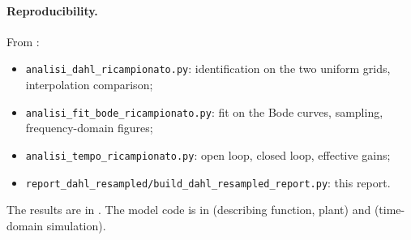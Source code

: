 \documentclass[10pt,a4paper]{article}
\numberwithin{equation}{section}
\begin{document}
\paragraph{Reproducibility.} From :
\begin{itemize}
\item \texttt{analisi\_dahl\_ricampionato.py}: identification on the two uniform grids, interpolation comparison;
\item \texttt{analisi\_fit\_bode\_ricampionato.py}: fit on the Bode curves, sampling, frequency-domain figures;
\item \texttt{analisi\_tempo\_ricampionato.py}: open loop, closed loop, effective gains;
\item \texttt{report\_dahl\_resampled/build\_dahl\_resampled\_report.py}: this report.
\end{itemize}
The results are in . The model code is in  (describing function, plant) and  (time-domain simulation).
\end{document}
